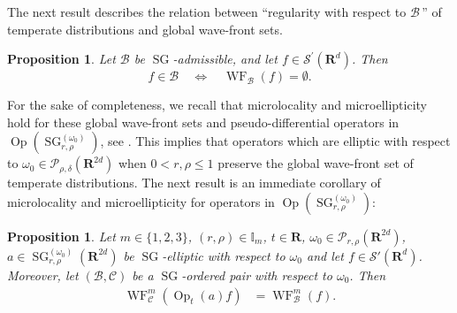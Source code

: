 \documentclass[12pt,a4paper,reqno]{amsart}
\numberwithin{equation}{section}
\numberwithin{thm}{section}
\newtheorem{prop}[thm]{Proposition}
\theoremstyle{definition}
\theoremstyle{remark}
\begin{document}
\par

The next result describes the relation between ``regularity with respect to
${{\mathcal B}}$\,'' of temperate distributions and global wave-front sets.

\par

\begin{prop}\label{mainthm4}
Let ${{\mathcal B}}$ be ${\operatorname{SG}}$-admissible, and let $f\in{{\mathscr S}}^\prime ({\mathbf R^{d}})$. Then
\begin{equation*}
f\in{{\mathcal B}} \quad \Longleftrightarrow \quad
{\operatorname{WF}_{{\mathcal B}}}(f)=\emptyset.
\end{equation*}
\end{prop}

\par

For the sake of completeness, we recall that microlocality and microellipticity
hold for these global wave-front sets and pseudo-differential operators in
${\operatorname{Op}}({\operatorname{SG}}^{(\omega_0)}_{r,\rho})$, see \cite{CJT2}.
This implies that 
operators which are elliptic with respect to $\omega _0\in \mathscr
P_{\rho,\delta}({\mathbf R^{{2d}}})$ when $0< r ,\rho \le 1$ preserve the global wave-front set
of temperate distributions. 
The next result is an immediate corollary
of microlocality and microellipticity
for operators in ${\operatorname{Op}}({\operatorname{SG}}^{(\omega_0)}_{r,\rho})$:

\par

\begin{prop}\label{hypoellthm}
Let $m\in \{ 1,2,3\}$, $(r,\rho )\in \mathbb I_m$, $t\in \mathbf R$, 
$\omega
_0\in  \mathscr P_{r,\rho}({\mathbf R^{{2d}}})$, $a\in {\operatorname{SG}}^{(\omega _0)}_{r,\rho} 
({\mathbf R^{{2d}}})$ be ${\operatorname{SG}}$-elliptic
with respect to $\omega _0$
and let $f\in {{\mathscr S}} '({\mathbf R^{d}})$. Moreover, let $({{\mathcal B}} , {{\mathcal C}} )$ be a 
${\operatorname{SG}}$-ordered pair with respect to $\omega _0$.
Then
\begin{align*}
{\operatorname{WF}} ^{m} _{\mathcal C} ({\operatorname{Op}} _t(a)f) &=
{\operatorname{WF}} ^{m}_{\mathcal B} (f).
\end{align*}
\end{prop}

\par
\end{document}
